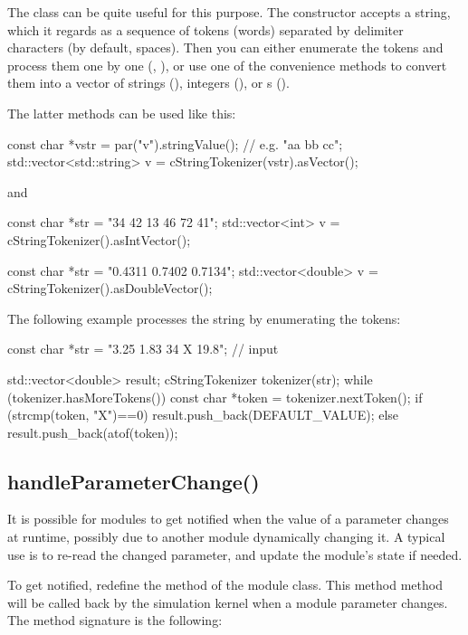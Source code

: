 The  class can be quite useful for this
purpose. The constructor accepts a string, which it regards as
a sequence of tokens (words) separated by delimiter characters
(by default, spaces). Then you can either enumerate the tokens
and process them one by one (, ),
or use one of the  convenience methods to convert
them into a vector of strings (), integers (),
or s ().

The latter methods can be used like this:

\begin{cpp}
const char *vstr = par("v").stringValue(); // e.g. "aa bb cc";
std::vector<std::string> v = cStringTokenizer(vstr).asVector();
\end{cpp}

and

\begin{cpp}
const char *str = "34 42 13 46 72 41";
std::vector<int> v = cStringTokenizer().asIntVector();

const char *str = "0.4311 0.7402 0.7134";
std::vector<double> v = cStringTokenizer().asDoubleVector();
\end{cpp}

The following example processes the string by enumerating the tokens:

\begin{cpp}
const char *str = "3.25 1.83 34 X 19.8"; // input

std::vector<double> result;
cStringTokenizer tokenizer(str);
while (tokenizer.hasMoreTokens())
{
    const char *token = tokenizer.nextToken();
    if (strcmp(token, "X")==0)
        result.push_back(DEFAULT_VALUE);
    else
        result.push_back(atof(token));
}
\end{cpp}

\subsection{handleParameterChange()}
\label{sec:simple-modules:handleParameterChange}

It is possible for modules to get notified when the value of a
parameter changes at runtime, possibly due to another module
dynamically changing it. A typical use is to re-read the changed
parameter, and update the module's state if needed.

To get notified, redefine the  method
of the module class. This method method will be called back by the
simulation kernel when a module parameter changes. The method signature
is the following:

